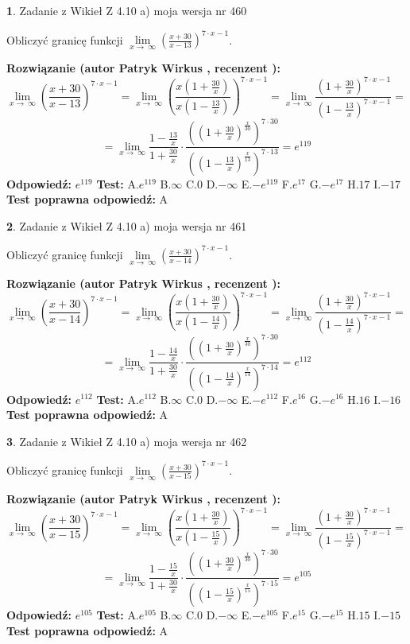 \documentclass[12pt, a4paper]{article}
\theoremstyle{definition} %
\newtheorem{zad}{}
\newcommand{\zadStart}[1]{\begin{zad}#1\newline}
\newcommand{\zadStop}{\end{zad}}
\newcommand{\rozwStart}[2]{\noindent \textbf{Rozwiązanie (autor #1 , recenzent #2): }\newline}
\newcommand{\rozwStop}{\newline}
\newcommand{\odpStart}{\noindent \textbf{Odpowiedź:}\newline}
\newcommand{\odpStop}{\newline}
\newcommand{\testStart}{\noindent \textbf{Test:}\newline}
\newcommand{\testStop}{\newline}
\newcommand{\kluczStart}{\noindent \textbf{Test poprawna odpowiedź:}\newline}
\newcommand{\kluczStop}{\newline}
\begin{document}
\zadStart{Zadanie z Wikieł Z 4.10 a) moja wersja nr 460}

Obliczyć granicę funkcji  $\lim\limits_{x\to\ \infty}(\frac{x+30}{x-13})^{7\cdot x-1}$.
\zadStop
\rozwStart{Patryk Wirkus}{}
$$\lim\limits_{x\to\ \infty}(\frac{x+30}{x-13})^{7\cdot x-1} = \lim\limits_{x\to\ \infty}(\frac{x(1+\frac{30}{x})}{x(1-\frac{13}{x})})^{7\cdot x-1}=\lim\limits_{x\to\ \infty}\frac{(1+\frac{30}{x})^{7\cdot x-1}}{(1-\frac{13}{x})^{7\cdot x-1}}=$$
$$=\lim\limits_{x\to\ \infty}\frac{1-\frac{13}{x}}{1+\frac{30}{x}}\cdot\frac{((1+\frac{30}{x})^{\frac{x}{30}})^{7\cdot30}}{((1-\frac{13}{x})^{\frac{x}{13}})^{7\cdot13}}=e^{119}$$
\rozwStop
\odpStart
$e^{119}$
\odpStop
\testStart
A.$e^{119}$ B.$\infty$ C.$0$ D.$-\infty$ E.$-e^{119}$
F.$e^{17}$ G.$-e^{17}$
H.$17$
I.$-17$
\testStop
\kluczStart
A
\kluczStop



\zadStart{Zadanie z Wikieł Z 4.10 a) moja wersja nr 461}

Obliczyć granicę funkcji  $\lim\limits_{x\to\ \infty}(\frac{x+30}{x-14})^{7\cdot x-1}$.
\zadStop
\rozwStart{Patryk Wirkus}{}
$$\lim\limits_{x\to\ \infty}(\frac{x+30}{x-14})^{7\cdot x-1} = \lim\limits_{x\to\ \infty}(\frac{x(1+\frac{30}{x})}{x(1-\frac{14}{x})})^{7\cdot x-1}=\lim\limits_{x\to\ \infty}\frac{(1+\frac{30}{x})^{7\cdot x-1}}{(1-\frac{14}{x})^{7\cdot x-1}}=$$
$$=\lim\limits_{x\to\ \infty}\frac{1-\frac{14}{x}}{1+\frac{30}{x}}\cdot\frac{((1+\frac{30}{x})^{\frac{x}{30}})^{7\cdot30}}{((1-\frac{14}{x})^{\frac{x}{14}})^{7\cdot14}}=e^{112}$$
\rozwStop
\odpStart
$e^{112}$
\odpStop
\testStart
A.$e^{112}$ B.$\infty$ C.$0$ D.$-\infty$ E.$-e^{112}$
F.$e^{16}$ G.$-e^{16}$
H.$16$
I.$-16$
\testStop
\kluczStart
A
\kluczStop



\zadStart{Zadanie z Wikieł Z 4.10 a) moja wersja nr 462}

Obliczyć granicę funkcji  $\lim\limits_{x\to\ \infty}(\frac{x+30}{x-15})^{7\cdot x-1}$.
\zadStop
\rozwStart{Patryk Wirkus}{}
$$\lim\limits_{x\to\ \infty}(\frac{x+30}{x-15})^{7\cdot x-1} = \lim\limits_{x\to\ \infty}(\frac{x(1+\frac{30}{x})}{x(1-\frac{15}{x})})^{7\cdot x-1}=\lim\limits_{x\to\ \infty}\frac{(1+\frac{30}{x})^{7\cdot x-1}}{(1-\frac{15}{x})^{7\cdot x-1}}=$$
$$=\lim\limits_{x\to\ \infty}\frac{1-\frac{15}{x}}{1+\frac{30}{x}}\cdot\frac{((1+\frac{30}{x})^{\frac{x}{30}})^{7\cdot30}}{((1-\frac{15}{x})^{\frac{x}{15}})^{7\cdot15}}=e^{105}$$
\rozwStop
\odpStart
$e^{105}$
\odpStop
\testStart
A.$e^{105}$ B.$\infty$ C.$0$ D.$-\infty$ E.$-e^{105}$
F.$e^{15}$ G.$-e^{15}$
H.$15$
I.$-15$
\testStop
\kluczStart
A
\kluczStop
\end{document}
